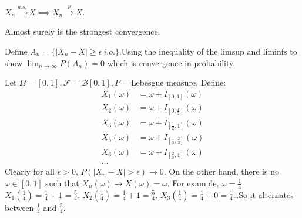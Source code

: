 \documentclass[class=article,crop=false]{standalone}
\begin{document}
\begin{thm}[]
	$ X_n \xrightarrow{ a.s.} X \implies  X_n \xrightarrow{ p}  X$.
\end{thm}
\begin{note}[]
Almost surely is the strongest convergence.
\end{note}
\begin{prf}
	Define $ A_n = \{|X_n - X| \geq \epsilon \ i.o.\}. $Using the inequality of the limsup and liminfs to show $ \lim_{ n \to \infty} P(A_n) = 0$ which is convergence in probability.
\end{prf}
\begin{eg}
	Let $ \Omega=[0,1], \mathcal{F}=\mathcal{B}[0,1], P=$Lebesgue measure. Define:
	\begin{align*}
		X_1(\omega) &= \omega + I_{[0,1]}{(\omega)}\\
		X_2(\omega) &= \omega + I_{[0,\frac{1}{2}]}{(\omega)} \\
	X_3(\omega) &= \omega + I_{[\frac{1}{2},1]}{(\omega)} \\
	X_5(\omega) &= \omega + I_{[\frac{1}{3},\frac{2}{3}]}{(\omega)} \\
X_6(\omega) &= \omega + I_{[\frac{2}{3},1]}{(\omega)} \\
		\ldots
	\end{align*}
	Clearly for all $ \epsilon>0$, $ P(|X_n -X|> \epsilon) \to 0$. On the other hand, there is no $ \omega \in [0,1]$ such that $ X_n(\omega) \to X(\omega) = \omega$. For example, $ \omega=\frac{1}{4}$, $ X_1(\frac{1}{4}) = \frac{1}{4}+1 = \frac{5}{4}$. $ X_2(\frac{1}{4}) = \frac{1}{4}+1 = \frac{5}{4}$. $ X_3(\frac{1}{4}) = \frac{1}{4} +0 = \frac{1}{4}$\ldots So it alternates between $ \frac{1}{4}$ and $ \frac{5}{4}$.
\end{eg}
\end{document}
